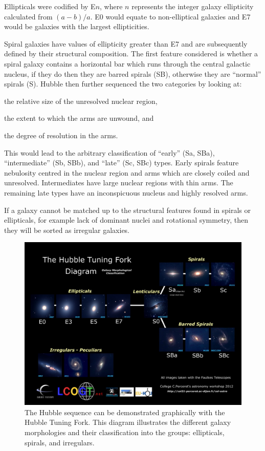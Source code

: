 \documentclass[12pt, twocolumn]{revtex4}    %
\begin{document}
Ellipticals were codified by E$n$, where $n$ represents the integer galaxy ellipticity calculated from $(a-b)/a$. E0 would equate to non-elliptical galaxies and E7 would be galaxies with the largest ellipticities. 

Spiral galaxies have values of ellipticity greater than E7 and are subsequently defined by their structural composition. The first feature considered is whether a spiral galaxy contains a horizontal bar which runs through the central galactic nucleus, if they do then they are barred spirals (SB), otherwise they are ``normal'' spirals (S). Hubble then further sequenced the two categories by looking at: 
\begin {enumerate*} [label=\itshape\alph*\upshape)]
\item the relative size of the unresolved nuclear region, \item the extent to which the arms are unwound, and \item the degree of resolution in the arms. 
\end {enumerate*} 
This would lead to the arbitrary classification of ``early'' (Sa, SBa), ``intermediate'' (Sb, SBb), and ``late'' (Sc, SBc) types. Early spirals feature nebulosity centred in the nuclear region and arms which are closely coiled and unresolved. Intermediates have large nuclear regions with thin arms. The remaining late types have an inconspicuous nucleus and highly resolved arms.  

If a galaxy cannot be matched up to the structural features found in spirals or ellipticals, for example lack of dominant nuclei and rotational symmetry, then they will be sorted as irregular galaxies.

\begin{figure}
\includegraphics[width=\textwidth]{introduction/hubble-tuning-fork-diagram}
\captionsetup{justification=justified}
\caption[Hubble Tuning Fork]{The Hubble sequence can be demonstrated graphically with the Hubble Tuning Fork. This diagram \citep{hubble_tuning_fork} illustrates the different galaxy morphologies and their classification into the groups: ellipticals, spirals, and irregulars.}
\label{fig:hubble_tuning_fork}
\end{figure}
\end{document}
